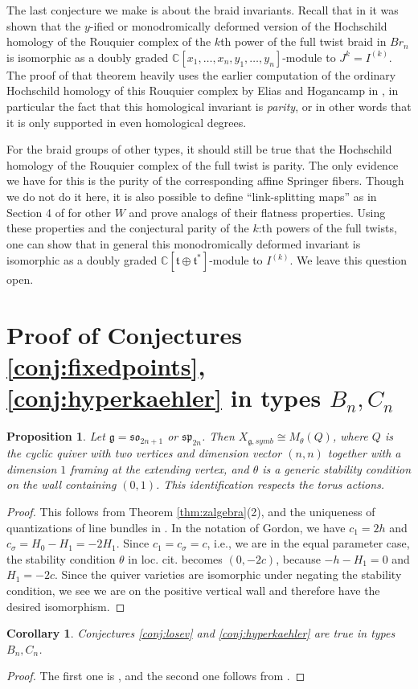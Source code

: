 \documentclass{amsart}
\numberwithin{equation}{section}
\newtheorem{corollary}[lemma]{Corollary}%
\newtheorem{proposition}[lemma]{Proposition}%
\theoremstyle{definition}
\newcommand{\fs}{\mathfrak{s}}
\newcommand{\fo}{\mathfrak{o}}
\newcommand{\fp}{\mathfrak{p}}
\newcommand{\fg}{\mathfrak{g}}
\newcommand{\ft}{\mathfrak{t}}
\newcommand{\C}{{\mathbb C}}
\begin{document}
The last conjecture we make is about the braid invariants. Recall that in \cite[Theorem 1.5.]{GH} it was shown that the $y$-ified or monodromically deformed version of the Hochschild homology of the Rouquier complex of the $k$th power of the full twist braid in $Br_n$ is isomorphic as a doubly graded $\C[x_1,\ldots, x_n,y_1,\ldots, y_n]$-module to $J^k=I^{(k)}$. The proof of that theorem heavily uses the earlier computation of the ordinary Hochschild homology of this Rouquier complex by Elias and Hogancamp in \cite{EH}, in particular the fact that this homological invariant is {\em parity}, or in other words that it is only supported in even homological degrees.

For the braid groups of other types, it should still be true that the Hochschild homology of the Rouquier complex of the full twist is parity. The only evidence we have for this is the purity of the corresponding affine Springer fibers. Though we do not do it here, it is also possible to define ``link-splitting maps'' as in Section 4 of \cite{GH} for other $W$ and prove analogs of their flatness properties. Using these properties and the conjectural parity of the $k$:th powers of the full twists, one can show that in general this monodromically deformed invariant is isomorphic as a doubly graded $\C[\ft\oplus \ft^*]$-module to $I^{(k)}$. We leave this question open.


\appendix
\section{Proof of Conjectures \ref{conj:fixedpoints}, \ref{conj:hyperkaehler} in types $B_n, C_n$}
\label{app:proofs}
\begin{proposition}
\label{prop:quiver}
Let $\fg=\fs\fo_{2n+1}$ or $\fs\fp_{2n}$. Then $X_{\fg,symb}\cong M_\theta(Q)$, where $Q$ is the cyclic quiver with two vertices and dimension vector $(n,n)$ together with a dimension $1$ framing at the extending vertex, and $\theta$ is a generic stability condition on the wall containing $(0,1)$. This identification respects the torus actions.
\end{proposition}
\begin{proof}
This follows from Theorem \ref{thm:zalgebra}(2), \cite[Theorem 4.1.]{GordonO} and the uniqueness of quantizations of line bundles in \cite[Proposition 5.2]{BPW}. In the notation of Gordon, we have $c_1=2h$ and $c_\sigma=H_0-H_1=-2H_1$. Since $c_1=c_\sigma=c$, i.e., we are in the equal parameter case, the stability condition $\theta$ in loc. cit. becomes $(0,-2c)$, because $-h-H_1=0$ and $H_1=-2c$. Since the quiver varieties are isomorphic under negating the stability condition, we see we are on the positive vertical wall and therefore have the desired isomorphism.
\end{proof}
\begin{corollary}
Conjectures \ref{conj:losev} and \ref{conj:hyperkaehler} are true in types $B_n, C_n$.
\end{corollary}
\begin{proof}
The first one is \cite[Remark 2.2.]{BAL}, and the second one follows from \cite[3.5.--3.7.]{GordonO}.
\end{proof}
\end{document}
